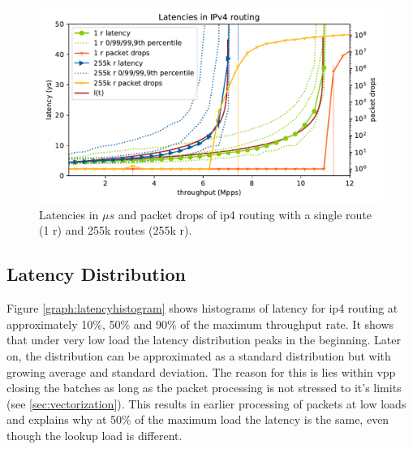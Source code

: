 \begin{figure}[!ht]
\noindent\hspace{0.5mm}\includegraphics[width=\linewidth]{pics/latencies_per_throughput_summary_ip4.pdf}
\caption{Latencies in $\mu s$ and packet drops of \Ac{ip4} routing with a single route (1 r) and 255k routes (255k r). }
\label{graph:latencyoverview}
\end{figure}

\subsection{Latency Distribution}

Figure \ref{graph:latencyhistogram} shows histograms of latency for
\Ac{ip4} routing at approximately 10\%, 50\% and 90\% of the maximum
throughput rate. It shows that under very low load the latency
distribution peaks in the beginning. Later on, the distribution can be
approximated as a standard distribution but with growing average and
standard deviation. The reason for this is lies within \Ac{vpp}
closing the batches as long as the packet processing is not stressed
to it's limits (see \ref{sec:vectorization}). This results in earlier
processing of packets at low loads and explains why at 50\% of the
maximum load the latency is the same, even though the lookup load is
different. \cite{linguaglossa2017high}





